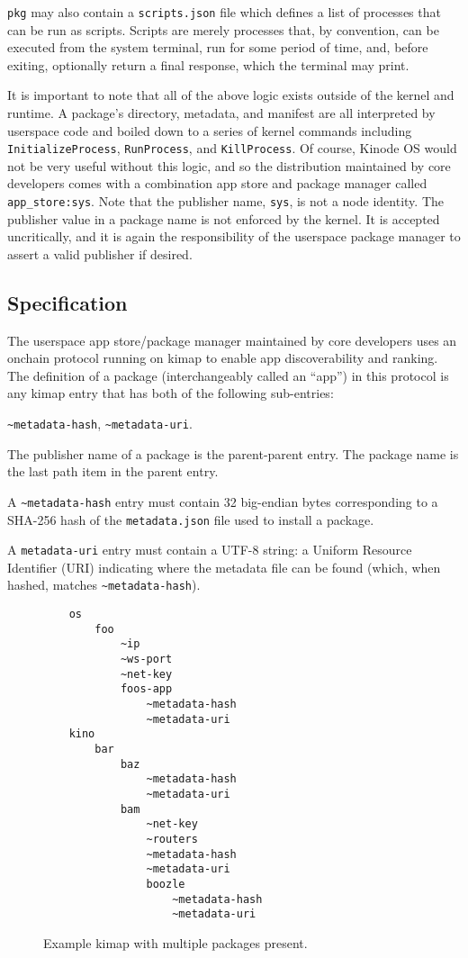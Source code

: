 \documentclass[runningheads]{llncs}
\begin{document}
\verb|pkg| may also contain a \verb|scripts.json| file which defines a list of processes that can be run as scripts.
Scripts are merely processes that, by convention, can be executed from the system terminal, run for some period of time, and, before exiting, optionally return a final response, which the terminal may print.

It is important to note that all of the above logic exists outside of the kernel and runtime.
A package's directory, metadata, and manifest are all interpreted by userspace code and boiled down to a series of kernel commands including \verb|InitializeProcess|, \verb|RunProcess|, and \verb|KillProcess|.
Of course, Kinode OS would not be very useful without this logic, and so the distribution maintained by core developers comes with a combination app store and package manager called \verb|app_store:sys|.
Note that the publisher name, \verb|sys|, is not a node identity.
The publisher value in a package name is not enforced by the kernel.
It is accepted uncritically, and it is again the responsibility of the userspace package manager to assert a valid publisher if desired.

\subsection{Specification}
\label{sec:packagemanagerspec}

The userspace app store/package manager maintained by core developers uses an onchain protocol running on kimap to enable app discoverability and ranking.
The definition of a package (interchangeably called an ``app'') in this protocol is any kimap entry that has both of the following sub-entries:

\verb|~metadata-hash|, \verb|~metadata-uri|.

The publisher name of a package is the parent-parent entry.
The package name is the last path item in the parent entry.

A \verb|~metadata-hash| entry must contain 32 big-endian bytes corresponding to a SHA-256 hash of the \verb|metadata.json| file used to install a package.

A \verb|metadata-uri| entry must contain a UTF-8 string: a Uniform Resource Identifier (URI) indicating where the metadata file can be found (which, when hashed, matches \verb|~metadata-hash|).

\begin{figure}[H]
    \centering
    \begin{verbatim}
    os
        foo
            ~ip
            ~ws-port
            ~net-key
            foos-app
                ~metadata-hash
                ~metadata-uri
    kino
        bar
            baz
                ~metadata-hash
                ~metadata-uri
            bam
                ~net-key
                ~routers
                ~metadata-hash
                ~metadata-uri
                boozle
                    ~metadata-hash
                    ~metadata-uri
    \end{verbatim}
    \caption{Example kimap with multiple packages present.}
    \label{fig:example kimap with packages}
\end{figure}
\end{document}
